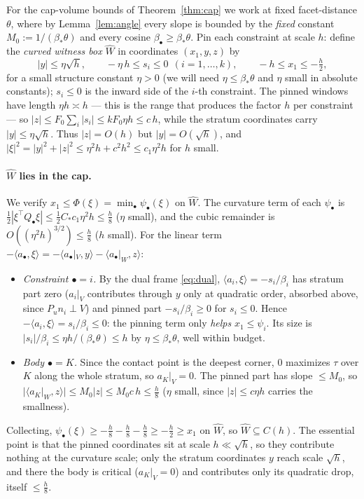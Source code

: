 \documentclass[11pt]{article}
\begin{document}
For the cap-volume bounds of Theorem~\ref{thm:cap} we work at fixed
facet-distance $\theta$, where by Lemma~\ref{lem:angle} every slope is bounded
by the \emph{fixed} constant $M_0:=1/(\beta_*\theta)$ and every cosine
$\beta_\bullet\ge\beta_*\theta$.  Pin each constraint at scale $h$: define the
\emph{curved witness box} $\widehat W$ in coordinates $(x_1,y,z)$ by
\begin{equation}\label{eq:cwbox}
|y|\le\eta\sqrt h,
\qquad
-\eta\,h\le s_i\le 0\ \ (i=1,\dots,k),
\qquad
-h\le x_1\le-\tfrac h2,
\end{equation}
for a small structure constant $\eta>0$ (we will need $\eta\le\beta_*\theta$ and
$\eta$ small in absolute constants); $s_i\le0$ is the inward side of the $i$-th
constraint.  The pinned windows have length $\eta h\asymp h$ --- this is the
range that produces the factor $h$ per constraint --- so $|z|\le F_0\sum_i|s_i|
\le kF_0\eta h\le c\,h$, while the stratum coordinates carry $|y|\le\eta\sqrt h$.
Thus $|z|=O(h)$ but $|y|=O(\sqrt h)$, and $|\xi|^2=|y|^2+|z|^2\le\eta^2 h+c^2h^2
\le c_1\eta^2 h$ for $h$ small.

\paragraph{$\widehat W$ lies in the cap.}
We verify $x_1\le\Phi(\xi)=\min_\bullet\psi_\bullet(\xi)$ on $\widehat W$.  The
curvature term of each $\psi_\bullet$ is
$\frac12|\xi^\top Q_\bullet\xi|\le\frac12 C_*c_1\eta^2 h\le\frac h8$ ($\eta$
small), and the cubic remainder is $O((\eta^2 h)^{3/2})\le\frac h8$ ($h$ small).
For the linear term $-\langle a_\bullet,\xi\rangle=-\langle a_\bullet|_V,y\rangle
-\langle a_\bullet|_W,z\rangle$:
\begin{itemize}
\item \emph{Constraint $\bullet=i$.}  By the dual frame \eqref{eq:dual},
$\langle a_i,\xi\rangle=-s_i/\beta_i$ has stratum part zero
($a_i|_V$ contributes through $y$ only at quadratic order, absorbed above, since
$P_un_i\perp V$) and pinned part $-s_i/\beta_i\ge0$ for $s_i\le0$.  Hence
$-\langle a_i,\xi\rangle=s_i/\beta_i\le0$: the pinning term only \emph{helps}
$x_1\le\psi_i$.  Its size is $|s_i|/\beta_i\le\eta h/(\beta_*\theta)\le h$ by
$\eta\le\beta_*\theta$, well within budget.
\item \emph{Body $\bullet=K$.}  Since the contact point is the deepest corner,
$0$ maximizes $\tau$ over $K$ along the whole stratum, so $a_K|_V=0$.  The pinned
part has slope $\le M_0$, so $|\langle a_K|_W,z\rangle|\le M_0|z|\le M_0c\,h
\le\frac h8$ ($\eta$ small, since $|z|\le c\eta h$ carries the smallness).
\end{itemize}
Collecting, $\psi_\bullet(\xi)\ge-\frac h8-\frac h8-\frac h8\ge-\frac h2\ge x_1$
on $\widehat W$, so $\widehat W\subseteq C(h)$.  The essential point is that the
pinned coordinates sit at scale $h\ll\sqrt h$, so they contribute nothing at the
curvature scale; only the stratum coordinates $y$ reach scale $\sqrt h$, and
there the body is critical ($a_K|_V=0$) and contributes only its quadratic drop,
itself $\le\frac h8$.
\end{document}
